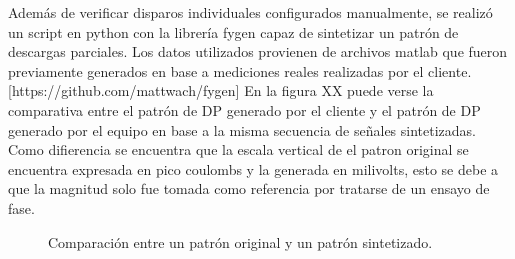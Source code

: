 Además de verificar disparos individuales configurados manualmente, se realizó un script en python con la librería fygen capaz de sintetizar un patrón de descargas parciales. Los datos utilizados provienen de archivos matlab que fueron previamente generados en base a mediciones reales realizadas por el cliente.
[https://github.com/mattwach/fygen]
En la figura XX puede verse la comparativa entre el patrón de DP generado por el cliente y el patrón de DP generado por el equipo en base a la misma secuencia de señales sintetizadas. Como difierencia se encuentra que la escala vertical de el patron original se encuentra expresada en pico coulombs y la generada en milivolts, esto se debe a que la magnitud solo fue tomada como referencia por tratarse de un ensayo de fase.


\begin{figure}[htp] 
    \centering
    \hfill%
    \caption{Comparación entre un patrón original y un patrón sintetizado.}
\end{figure}

